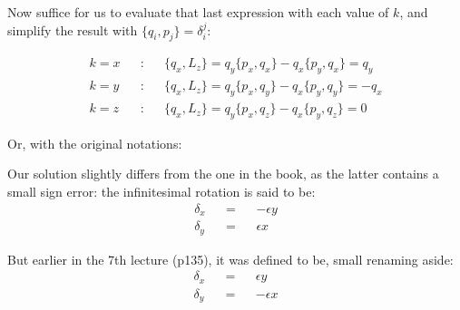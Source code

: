 \documentclass[solutions.tex]{subfiles}
\begin{document}
Now suffice for us to evaluate that last expression with each value of $k$,
and simplify the result with $\{ q_i, p_j \} = \delta_i^j$:

\begin{equation*}\begin{aligned}
	k = x &&:&& \{ q_x, L_z \} = q_y\{ p_x, q_x \} - q_x\{ p_y, q_x \} = q_y \\
	k = y &&:&& \{ q_x, L_z \} = q_y\{ p_x, q_y \} - q_x\{ p_y, q_y \} = -q_x \\
	k = z &&:&& \{ q_x, L_z \} = q_y\{ p_x, q_z \} - q_x\{ p_y, q_z \} = 0
\end{aligned}\end{equation*}

Or, with the original notations:


\begin{remark} Our solution slightly differs from the one in the book,
as the latter contains a small sign error: the infinitesimal
rotation is said to be:
\begin{equation*}\begin{aligned}
	\delta_x &&=&& -\epsilon y \\
	\delta_y &&=&& \epsilon x
\end{aligned}\end{equation*}

But earlier in the 7th lecture (p135), it was defined to be,
small renaming aside:
\begin{equation*}\begin{aligned}
	\delta_x &&=&& \epsilon y \\
	\delta_y &&=&& -\epsilon x
\end{aligned}\end{equation*}
\end{remark}
\end{document}
